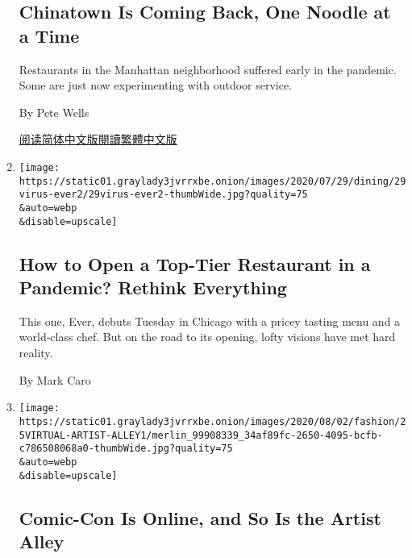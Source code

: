 \begin{enumerate}
  \hypertarget{chinatown-is-coming-back-one-noodle-at-a-time}{%
  \subsection{Chinatown Is Coming Back, One Noodle at a
  Time}\label{chinatown-is-coming-back-one-noodle-at-a-time}}

  Restaurants in the Manhattan neighborhood suffered early in the
  pandemic. Some are just now experimenting with outdoor service.

  By Pete Wells

  \href{https://cn.nytimes3xbfgragh.onion/style/20200804/chinatown-outdoor-dining-coronavirus/}{阅读简体中文版}\href{https://cn.nytimes3xbfgragh.onion/style/20200804/chinatown-outdoor-dining-coronavirus/zh-hant/}{閱讀繁體中文版}
\item
  \href{/2020/07/28/dining/ever-chicago-restaurant-coronavirus.html}{}

  \texttt{[image: https://static01.graylady3jvrrxbe.onion/images/2020/07/29/dining/29virus-ever2/29virus-ever2-thumbWide.jpg?quality=75\\\&auto=webp\\\&disable=upscale]}

  \hypertarget{how-to-open-a-top-tier-restaurant-in-a-pandemic-rethink-everything}{%
  \subsection{How to Open a Top-Tier Restaurant in a Pandemic? Rethink
  Everything}\label{how-to-open-a-top-tier-restaurant-in-a-pandemic-rethink-everything}}

  This one, Ever, debuts Tuesday in Chicago with a pricey tasting menu
  and a world-class chef. But on the road to its opening, lofty visions
  have met hard reality.

  By Mark Caro
\item
  \href{/2020/07/25/style/comic-con-online-artist-alley.html}{}

  \texttt{[image: https://static01.graylady3jvrrxbe.onion/images/2020/08/02/fashion/25VIRTUAL-ARTIST-ALLEY1/merlin\_99908339\_34af89fc-2650-4095-bcfb-c786508068a0-thumbWide.jpg?quality=75\\\&auto=webp\\\&disable=upscale]}

  \hypertarget{comic-con-is-online-and-so-is-the-artist-alley}{%
  \subsection{Comic-Con Is Online, and So Is the Artist
  Alley}\label{comic-con-is-online-and-so-is-the-artist-alley}}


\end{enumerate}
